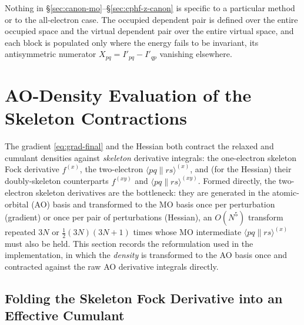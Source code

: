 \documentclass[12pt]{article}
\newcommand{\adb}[2]{\langle #1 \| #2 \rangle}
\begin{document}
Nothing in \S\ref{sec:canon-mo}--\S\ref{sec:cphf-z-canon} is specific to a particular method or to the all-electron
case.  The occupied dependent pair is defined over the entire occupied space and
the virtual dependent pair over the entire virtual space, and each block is
populated only where the energy fails to be invariant, its antisymmetric
numerator $X_{pq}=I'_{pq}-I'_{qp}$ vanishing elsewhere.

\section{AO-Density Evaluation of the Skeleton Contractions}
\label{sec:ao-density}

The gradient \eqref{eq:grad-final} and the Hessian both contract the relaxed and
cumulant densities against {\em skeleton} derivative integrals: the one-electron
skeleton Fock derivative $f^{(x)}$, the two-electron $\adb{pq}{rs}^{(x)}$, and (for
the Hessian) their doubly-skeleton counterparts $f^{(xy)}$ and
$\adb{pq}{rs}^{(xy)}$.  Formed directly, the two-electron skeleton derivatives are
the bottleneck: they are generated in the atomic-orbital (AO) basis and transformed
to the MO basis once per perturbation (gradient) or once per pair of perturbations
(Hessian), an $O(N^5)$ transform repeated $3N$ or $\tfrac12(3N)(3N{+}1)$ times whose
MO intermediate $\adb{pq}{rs}^{(x)}$ must also be held.  This section records the
reformulation used in the implementation, in which the {\em density} is transformed
to the AO basis once and contracted against the raw AO derivative integrals directly.

\subsection{Folding the Skeleton Fock Derivative into an Effective Cumulant}
\end{document}
